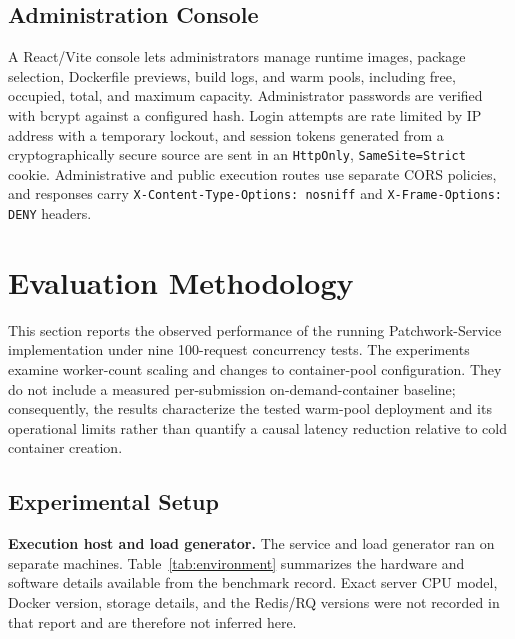 \documentclass[conference]{IEEEtran}
\begin{document}
\subsection{Administration Console}
A React/Vite console lets administrators manage runtime images, package selection, Dockerfile previews, build logs, and warm pools, including free, occupied, total, and maximum capacity. Administrator passwords are verified with bcrypt against a configured hash. Login attempts are rate limited by IP address with a temporary lockout, and session tokens generated from a cryptographically secure source are sent in an \texttt{HttpOnly}, \texttt{SameSite=Strict} cookie. Administrative and public execution routes use separate CORS policies, and responses carry \texttt{X-Content-Type-Options: nosniff} and \texttt{X-Frame-Options: DENY} headers.

\section{Evaluation Methodology}
This section reports the observed performance of the running Patchwork-Service implementation under nine 100-request concurrency tests. The experiments examine worker-count scaling and changes to container-pool configuration. They do not include a measured per-submission on-demand-container baseline; consequently, the results characterize the tested warm-pool deployment and its operational limits rather than quantify a causal latency reduction relative to cold container creation.

\subsection{Experimental Setup}
\textbf{Execution host and load generator.} The service and load generator ran on separate machines. Table~\ref{tab:environment} summarizes the hardware and software details available from the benchmark record. Exact server CPU model, Docker version, storage details, and the Redis/RQ versions were not recorded in that report and are therefore not inferred here.
\end{document}
